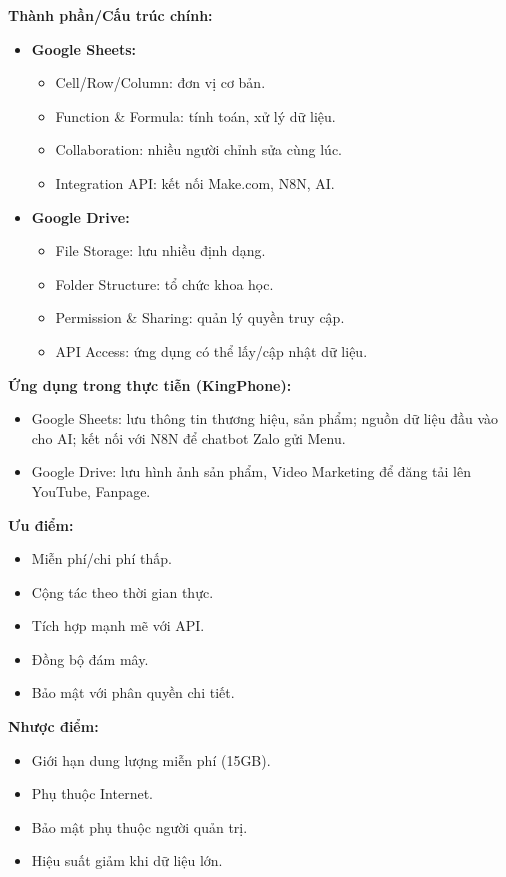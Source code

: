 \textbf{Thành phần/Cấu trúc chính:}
\begin{itemize}
    \item \textbf{Google Sheets:}
    \begin{itemize}
        \item Cell/Row/Column: đơn vị cơ bản.
        \item Function \& Formula: tính toán, xử lý dữ liệu.
        \item Collaboration: nhiều người chỉnh sửa cùng lúc.
        \item Integration API: kết nối Make.com, N8N, AI.
    \end{itemize}
    \item \textbf{Google Drive:}
    \begin{itemize}
        \item File Storage: lưu nhiều định dạng.
        \item Folder Structure: tổ chức khoa học.
        \item Permission \& Sharing: quản lý quyền truy cập.
        \item API Access: ứng dụng có thể lấy/cập nhật dữ liệu.
    \end{itemize}
\end{itemize}

\textbf{Ứng dụng trong thực tiễn (KingPhone):}
\begin{itemize}
    \item Google Sheets: lưu thông tin thương hiệu, sản phẩm; nguồn dữ liệu đầu vào cho AI; kết nối với N8N để chatbot Zalo gửi Menu.
    \item Google Drive: lưu hình ảnh sản phẩm, Video Marketing để đăng tải lên YouTube, Fanpage.
\end{itemize}

\textbf{Ưu điểm:}
\begin{itemize}
    \item Miễn phí/chi phí thấp.
    \item Cộng tác theo thời gian thực.
    \item Tích hợp mạnh mẽ với API.
    \item Đồng bộ đám mây.
    \item Bảo mật với phân quyền chi tiết.
\end{itemize}

\textbf{Nhược điểm:}
\begin{itemize}
    \item Giới hạn dung lượng miễn phí (15GB).
    \item Phụ thuộc Internet.
    \item Bảo mật phụ thuộc người quản trị.
    \item Hiệu suất giảm khi dữ liệu lớn.
\end{itemize}

